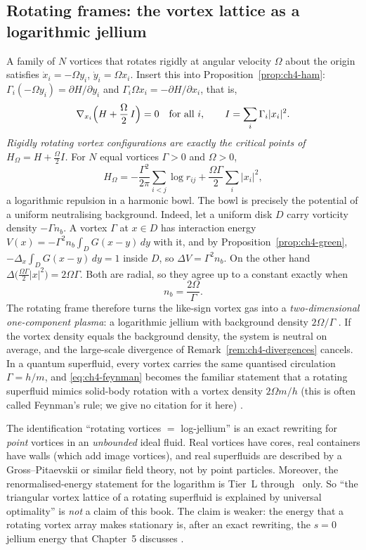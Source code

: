 \subsection{Rotating frames: the vortex lattice as a logarithmic jellium}
A family of $N$ vortices that rotates rigidly at angular velocity $\Omega$ about the origin satisfies
$\dot x_i = -\Omega y_i$, $\dot y_i=\Omega x_i$. Insert this into Proposition~\ref{prop:ch4-ham}:
$\Gamma_i(-\Omega y_i) = \partial H/\partial y_i$ and $\Gamma_i\Omega x_i = -\partial H/\partial x_i$, that is,
\begin{equation}\label{eq:ch4-rotframe}
\nabla_{x_i}\Bigl(H + \frac{\Omega}{2}\,I\Bigr) = 0\quad\text{for all } i,\qquad
I=\sum_i\Gamma_i|x_i|^2 .
\end{equation}
\emph{Rigidly rotating vortex configurations are exactly the critical points of $H_\Omega=H+\frac{\Omega}{2}I$.}
For $N$ equal vortices $\Gamma>0$ and $\Omega>0$,
\[
H_\Omega = -\frac{\Gamma^2}{2\pi}\sum_{i<j}\log r_{ij} + \frac{\Omega\Gamma}{2}\sum_i|x_i|^2,
\]
a logarithmic repulsion in a harmonic bowl. The bowl is precisely the potential of a uniform neutralising
background. Indeed, let a uniform disk $D$ carry vorticity density $-\Gamma n_b$. A vortex $\Gamma$ at $x\in D$
has interaction energy $V(x) = -\Gamma^2 n_b\int_D G(x-y)\,dy$ with it, and by Proposition~\ref{prop:ch4-green},
$-\Delta_x\int_D G(x-y)\,dy = 1$ inside $D$, so $\Delta V = \Gamma^2 n_b$. On the other hand
$\Delta\bigl(\frac{\Omega\Gamma}{2}|x|^2\bigr) = 2\Omega\Gamma$. Both are radial, so they agree up to a constant
exactly when
\begin{equation}\label{eq:ch4-feynman}
n_b = \frac{2\Omega}{\Gamma}.
\end{equation}
The rotating frame therefore turns the like-sign vortex gas into a \emph{two-dimensional one-component plasma}: a
logarithmic jellium with background density $2\Omega/\Gamma$ \tierC. If the vortex density equals the background
density, the system is neutral on average, and the large-scale divergence of Remark~\ref{rem:ch4-divergences}
cancels. In a quantum superfluid, every vortex carries the same quantised circulation $\Gamma=h/m$, and
\eqref{eq:ch4-feynman} becomes the familiar statement that a rotating superfluid mimics solid-body rotation with a
vortex density $2\Omega m/h$ (this is often called Feynman's rule; we give no citation for it here) \tierC.

\begin{warnbox}
The identification ``rotating vortices $=$ log-jellium'' is an exact rewriting for \emph{point} vortices in an
\emph{unbounded} ideal fluid. Real vortices have cores, real containers have walls (which add image vortices), and
real superfluids are described by a Gross--Pitaevskii or similar field theory, not by point particles. Moreover,
the renormalised-energy statement for the logarithm is Tier~L through~\cite{oai} only. So ``the triangular vortex
lattice of a rotating superfluid is explained by universal optimality'' is \emph{not} a claim of this book. The
claim is weaker: the energy that a rotating vortex array makes stationary is, after an exact rewriting, the
$s=0$ jellium energy that Chapter~5 discusses \tierC.
\end{warnbox}

